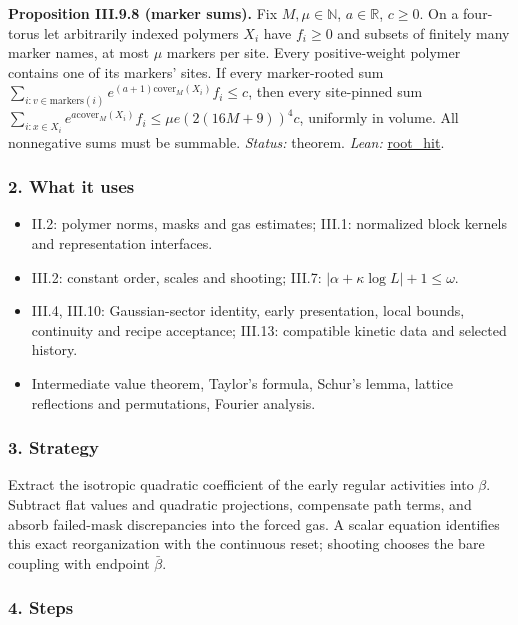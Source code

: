 \documentclass[
  letterpaper,
  11pt]{article}
\providecommand{\tightlist}{%
  \setlength{\itemsep}{0pt}\setlength{\parskip}{0pt}}
\begin{document}
\textbf{Proposition III.9.8 (marker sums).} Fix \(M,\mu\in\mathbb N\),
\(a\in\mathbb R\), \(c\ge0\). On a four-torus let arbitrarily indexed
polymers \(X_i\) have \(f_i\ge0\) and subsets of finitely many marker
names, at most \(\mu\) markers per site. Every positive-weight polymer
contains one of its markers' sites. If every marker-rooted sum
\(\sum_{i:v\in\mathrm{markers}(i)}e^{(a+1)\mathrm{cover}_M(X_i)}f_i\le c\),
then every site-pinned sum
\(\sum_{i:x\in X_i}e^{a\mathrm{cover}_M(X_i)}f_i\le\mu e(2(16M+9))^4c\),
uniformly in volume. All nonnegative sums must be summable.
\emph{Status:} theorem. \emph{Lean:}
\href{https://github.com/yang-mills-group/OpenAI-YM-20261028/blob/3456e5e75cf8d4cd558955a5c7638fba2d68f464/YM/Extra/MULTISOURCE_BOUNDS/Root.lean\#L161-L199}{root\_hit}.

\subsubsection{2. What it uses}\label{what-it-uses-11}

\begin{itemize}
\tightlist
\item
  II.2: polymer norms, masks and gas estimates; III.1: normalized block
  kernels and representation interfaces.
\item
  III.2: constant order, scales and shooting; III.7:
  \(|\alpha+\kappa\log L|+1\le\omega\).
\item
  III.4, III.10: Gaussian-sector identity, early presentation, local
  bounds, continuity and recipe acceptance; III.13: compatible kinetic
  data and selected history.
\item
  Intermediate value theorem, Taylor's formula, Schur's lemma, lattice
  reflections and permutations, Fourier analysis.
\end{itemize}

\subsubsection{3. Strategy}\label{strategy-11}

Extract the isotropic quadratic coefficient of the early regular
activities into \(\beta\). Subtract flat values and quadratic
projections, compensate path terms, and absorb failed-mask discrepancies
into the forced gas. A scalar equation identifies this exact
reorganization with the continuous reset; shooting chooses the bare
coupling with endpoint \(\bar\beta\).

\subsubsection{4. Steps}\label{steps-11}
\end{document}
